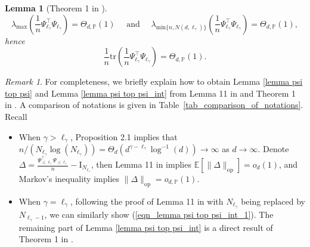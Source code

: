 \documentclass{article}
\theoremstyle{plain}
\newtheorem{lemma}[theorem]{Lemma}
\theoremstyle{definition}
\theoremstyle{remark}
\newtheorem{remark}[theorem]{Remark}
\newcommand{\dhnote}[1]{{\color{red}[#1]} } %
\begin{document}
\begin{appendix}
\begin{lemma}[Theorem 1 in  \cite{xiao2022precise}]
    $$
    \lambda_{\text{max}}\left(\frac{1}{n} \Psi_{\ell_{\gamma}}^{\top} \Psi_{\ell_{\gamma}}\right) = \Theta_{d, \mathbb{P}}(1)
    \quad \text{ and } \quad 
    \lambda_{\text{min}\{n, N(d, \ell_{\gamma})\}}\left(\frac{1}{n} \Psi_{\ell_{\gamma}}^{\top} \Psi_{\ell_{\gamma}}\right) = \Theta_{d, \mathbb{P}}(1),
    $$
    hence 
    $$
    \frac{1}{n} \mathrm{tr}\left(\frac{1}{n} \Psi_{\ell_{\gamma}}^{\top} \Psi_{\ell_{\gamma}}\right) = \Theta_{d, \mathbb{P}}(1).
    $$
    
\end{lemma}


\begin{remark}
    For completeness, we briefly explain how to obtain Lemma \ref{lemma psi top psi} and Lemma \ref{lemma psi top psi_int} from Lemma 11 in \cite{ghorbani2021linearized} and Theorem 1 in \cite{xiao2022precise}. 
    A comparison of notations is given in Table~\ref{tab_comparison_of_notations}. 
    Recall  
    \begin{itemize}
        \item When $\gamma > \ell_{\gamma}$, Proposition 2.1 implies that $n/(N_{\ell_{\gamma}} \log(N_{\ell_{\gamma}}))   = \Theta_d(d^{\gamma - \ell_{\gamma}}\log^{-1}(d)) \to \infty$ as $d \to \infty$. 
        Denote $\Delta = \frac{\Psi_{\leq \ell_{\gamma}}^{\top} \Psi_{\leq \ell_{\gamma}} }{n} - \mathrm{I}_{N_{\ell_{\gamma}}}$, then Lemma 11 in \cite{ghorbani2021linearized} implies $\mathbb{E}[\|\Delta\|_{\mathrm{op}}] = o_{d}(1)$, and Markov's inequality implies $\|\Delta\|_{\mathrm{op}} = o_{d, \mathbb{P}}(1)$.

        \vspace{3pt}

        \item When $\gamma = \ell_{\gamma}$, following the proof of Lemma 11 in \cite{ghorbani2021linearized} with $N_{\ell_{\gamma}}$ being replaced by $N_{\ell_{\gamma}-1}$, we can similarly show (\ref{eqn_lemma psi top psi_int_1}). The remaining part of Lemma \ref{lemma psi top psi_int} is a direct result of Theorem 1 in \cite{xiao2022precise}.
        
    \end{itemize}


    
\end{remark}




\end{appendix}
\end{document}
